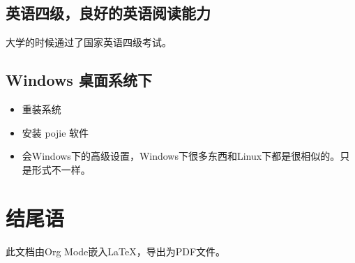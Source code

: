 \documentclass[11pt]{article}
\begin{document}
\subsection{英语四级，良好的英语阅读能力}
\label{sec:org0aa5302}

大学的时候通过了国家英语四级考试。

\subsection{Windows 桌面系统下}
\label{sec:org64c9278}

\begin{itemize}
\item 重装系统
\item 安装 pojie 软件
\item 会Windows下的高级设置，Windows下很多东西和Linux下都是很相似的。只是形式不一样。
\end{itemize}

\section{结尾语}
\label{sec:org854376f}

此文档由Org Mode嵌入\LaTeX{}，导出为PDF文件。
\end{document}
